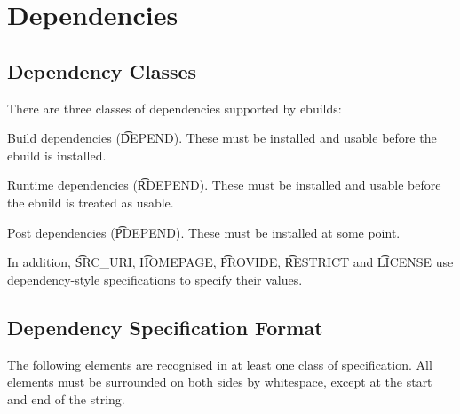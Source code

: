 \chapter{Dependencies}
\label{dependencies}

\section{Dependency Classes}

There are three classes of dependencies supported by ebuilds:

\begin{compactitem}
\item Build dependencies (\t{DEPEND}). These must be installed and usable before the ebuild
    is installed.
\item Runtime dependencies (\t{RDEPEND}). These must be installed and usable before the ebuild
    is treated as usable.
\item Post dependencies (\t{PDEPEND}). These must be installed at some point.
\end{compactitem}

In addition, \t{SRC\_URI}, \t{HOMEPAGE}, \t{PROVIDE}, \t{RESTRICT} and \t{LICENSE} use
dependency-style specifications to specify their values.

\section{Dependency Specification Format}

The following elements are recognised in at least one class of specification. All elements must
be surrounded on both sides by whitespace, except at the start and end of the string.

